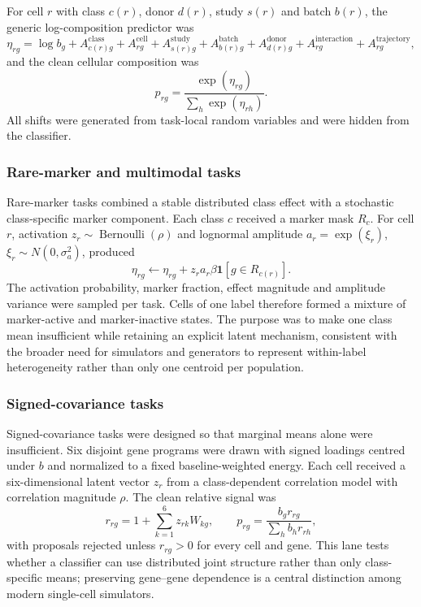 \documentclass[12pt]{article}
\begin{document}
For cell $r$ with class $c(r)$, donor $d(r)$, study $s(r)$ and batch $b(r)$, the generic log-composition predictor was
\begin{equation}
\eta_{rg}=\log b_g+A^{\mathrm{class}}_{c(r)g}+A^{\mathrm{cell}}_{rg}+A^{\mathrm{study}}_{s(r)g}+A^{\mathrm{batch}}_{b(r)g}+A^{\mathrm{donor}}_{d(r)g}+A^{\mathrm{interaction}}_{r g}+A^{\mathrm{trajectory}}_{r g},
\end{equation}
and the clean cellular composition was
\begin{equation}
p_{rg}=\frac{\exp(\eta_{rg})}{\sum_h\exp(\eta_{rh})}.
\end{equation}
All shifts were generated from task-local random variables and were hidden from the classifier.

\subsubsection*{Rare-marker and multimodal tasks}

Rare-marker tasks combined a stable distributed class effect with a stochastic class-specific marker component. Each class $c$ received a marker mask $R_c$. For cell $r$, activation $z_r\sim\operatorname{Bernoulli}(\rho)$ and lognormal amplitude $a_r=\exp(\xi_r)$, $\xi_r\sim N(0,\sigma_a^2)$, produced
\begin{equation}
\eta_{rg}\leftarrow\eta_{rg}+z_r a_r\beta\mathbf{1}[g\in R_{c(r)}].
\end{equation}
The activation probability, marker fraction, effect magnitude and amplitude variance were sampled per task. Cells of one label therefore formed a mixture of marker-active and marker-inactive states. The purpose was to make one class mean insufficient while retaining an explicit latent mechanism, consistent with the broader need for simulators and generators to represent within-label heterogeneity rather than only one centroid per population\cite{song2024scdesign3,marouf2020cscgan}.

\subsubsection*{Signed-covariance tasks}

Signed-covariance tasks were designed so that marginal means alone were insufficient. Six disjoint gene programs were drawn with signed loadings centred under $b$ and normalized to a fixed baseline-weighted energy. Each cell received a six-dimensional latent vector $z_r$ from a class-dependent correlation model with correlation magnitude $\rho$. The clean relative signal was
\begin{equation}
r_{rg}=1+\sum_{k=1}^{6}z_{rk}W_{kg},\qquad p_{rg}=\frac{b_gr_{rg}}{\sum_hb_hr_{rh}},
\end{equation}
with proposals rejected unless $r_{rg}>0$ for every cell and gene. This lane tests whether a classifier can use distributed joint structure rather than only class-specific means; preserving gene--gene dependence is a central distinction among modern single-cell simulators\cite{sun2021scdesign2,song2024scdesign3}.
\end{document}
